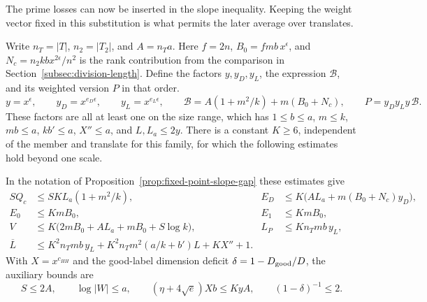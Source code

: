 The prime losses can now be inserted in the slope inequality. Keeping the weight vector fixed in this substitution is what permits the later average over translates.
\begin{established}\label{hyp:absorption-inputs}\label{cor:frames-11}
Write \(n_T=|T|\), \(n_2=|T_2|\), and \(A=n_Ta\).
Here \(f=2n\), \(B_0=fmb\,x^\epsilon\), and
\(N_c=n_2 k b x^{2\epsilon}/n^2\) is the rank contribution
from the comparison in Section~\ref{subsec:division-length}.
Define the factors \(y,y_D,y_L\), the expression \(\mathcal B\),
and its weighted version \(P\) in that order.
\[
 y=x^\epsilon,\qquad y_D=x^{e_D\epsilon},\qquad
 y_L=x^{e_L\epsilon},\qquad
 \mathcal B=A(1+m^2/k)+m(B_0+N_c),\qquad
 P=y_Dy_Ly\,\mathcal B .
\]
These factors are all at least one on the size range, which has
\(1\le b\le a\), \(m\le k\), \(mb\le a\), \(kb'\le a\),
\(X''\le a\), and \(L,L_a\le2y\).
There is a constant \(K\ge6\), independent of the member and translate for
this family, for which the following estimates hold beyond one scale.

In the notation of Proposition~\ref{prop:fixed-point-slope-gap} these estimates give
\begin{align*}
 S Q_c&\le S K L_a(1+m^2/k),&
 E_D&\le K\big(A L_a+m(B_0+N_c)y_D\big),\\
 E_0&\le K mB_0,& E_1&\le K mB_0,\\
 V&\le K\big(2mB_0+A L_a+mB_0+S\log k\big),&
 L_P&\le K n_Tmb\,y_L,\\
 \overline L&\le K^2 n_Tmb\,y_L
      + K^2 n_Tm^2(a/k+b')L+KX''+1 .
\end{align*}
With \(X=x^{c_{HH}}\) and the good-label dimension deficit
\(\delta=1-D_{\rm good}/D\), the auxiliary bounds are
\[
 S\le2A,\qquad \log|W|\le a,\qquad
 (\eta+4\sqrt e)Xb\le K y A,\qquad (1-\delta)^{-1}\le2.
\]
\end{established}
